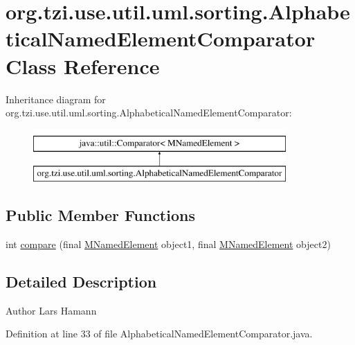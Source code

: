 \hypertarget{classorg_1_1tzi_1_1use_1_1util_1_1uml_1_1sorting_1_1_alphabetical_named_element_comparator}{\section{org.\-tzi.\-use.\-util.\-uml.\-sorting.\-Alphabetical\-Named\-Element\-Comparator Class Reference}
\label{classorg_1_1tzi_1_1use_1_1util_1_1uml_1_1sorting_1_1_alphabetical_named_element_comparator}
}
Inheritance diagram for org.\-tzi.\-use.\-util.\-uml.\-sorting.\-Alphabetical\-Named\-Element\-Comparator\-:\begin{figure}[H]
\begin{center}
\leavevmode
\includegraphics[height=2.000000cm]{classorg_1_1tzi_1_1use_1_1util_1_1uml_1_1sorting_1_1_alphabetical_named_element_comparator}
\end{center}
\end{figure}
\subsection*{Public Member Functions}
\begin{DoxyCompactItemize}
\item 
int \hyperlink{classorg_1_1tzi_1_1use_1_1util_1_1uml_1_1sorting_1_1_alphabetical_named_element_comparator_ac3d8dbde6af03338bd9c3f33abaee392}{compare} (final \hyperlink{interfaceorg_1_1tzi_1_1use_1_1uml_1_1mm_1_1_m_named_element}{M\-Named\-Element} object1, final \hyperlink{interfaceorg_1_1tzi_1_1use_1_1uml_1_1mm_1_1_m_named_element}{M\-Named\-Element} object2)
\end{DoxyCompactItemize}


\subsection{Detailed Description}
\begin{DoxyAuthor}{Author}
Lars Hamann 
\end{DoxyAuthor}


Definition at line 33 of file Alphabetical\-Named\-Element\-Comparator.\-java.



